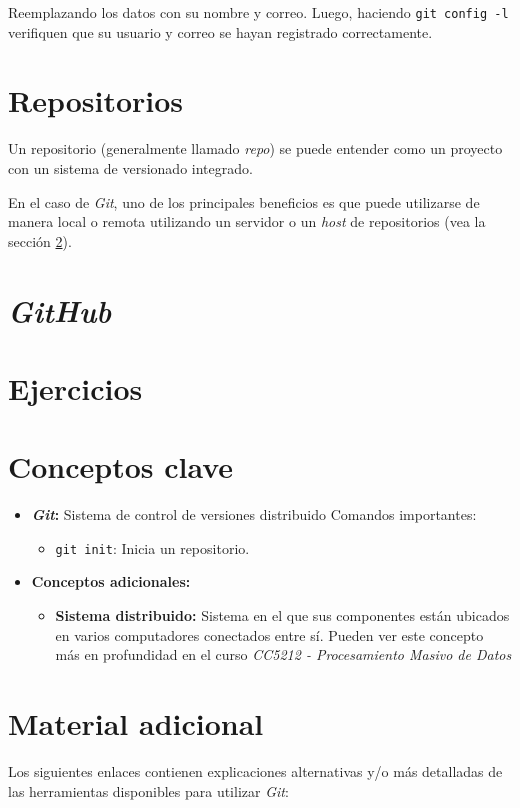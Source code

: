     Reemplazando los datos con su nombre y correo.
    Luego, haciendo \texttt{git config -l} verifiquen que su usuario y correo se
    hayan registrado correctamente.

  \section{Repositorios}
    Un repositorio (generalmente llamado \textit{repo}) se puede entender como un proyecto
    con un sistema de versionado integrado.

    En el caso de \textit{Git}, uno de los principales beneficios es que puede utilizarse
    de manera local o remota utilizando un servidor o un \textit{host} de repositorios 
    (vea la sección \ref{sec:github}).

  \section{\textit{GitHub}}
    \label{sec:github}

  \section{Ejercicios}
  \section{Conceptos clave}
    \begin{itemize}
      \item \textbf{\textit{Git}:} Sistema de control de versiones distribuido
        Comandos importantes:
        \begin{itemize}
          \item \texttt{git init}: Inicia un repositorio.
        \end{itemize}
      \item \textbf{Conceptos adicionales:}
        \begin{itemize}
          \item \textbf{Sistema distribuido:\label{kw:distr-sist}}
            Sistema en el que sus componentes están ubicados en varios computadores 
            conectados entre sí.
            Pueden ver este concepto más en profundidad en el curso \textit{CC5212 - 
            Procesamiento Masivo de Datos}
        \end{itemize} 
    \end{itemize}
  \section{Material adicional}
    Los siguientes enlaces contienen explicaciones alternativas y/o más detalladas de
    las herramientas disponibles para utilizar \textit{Git}:
    
